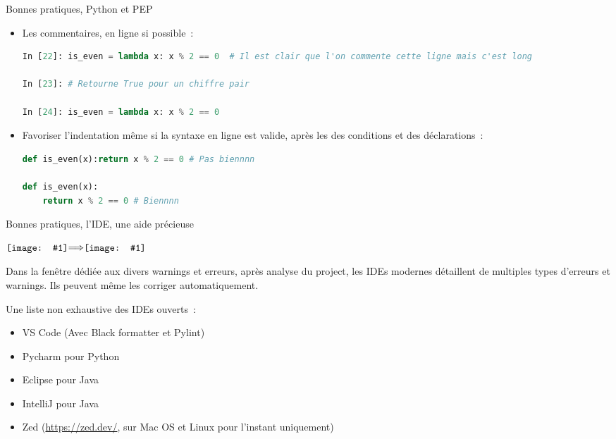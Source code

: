 \documentclass{beamer}
\newcommand*{\vcenterimage}[1]{\vcenter{\hbox{\texttt{[image: \#1]}}}}
\newcommand*{\vcenterarrow}{\vcenter{\hbox{$\Longrightarrow$}}}
\begin{document}
    \begin{frame}[fragile]{Bonnes pratiques, Python et PEP}
        \begin{itemize}
            \item Les commentaires, en ligne si possible~:
            \begin{lstlisting}[language=python]
In [22]: is_even = lambda x: x % 2 == 0  # Il est clair que l'on commente cette ligne mais c'est long

In [23]: # Retourne True pour un chiffre pair

In [24]: is_even = lambda x: x % 2 == 0
            \end{lstlisting}
            \item Favoriser l'indentation même si la syntaxe en ligne est valide, après les \textquote{:} des conditions et des déclarations~:
            \begin{lstlisting}[language=python]
def is_even(x):return x % 2 == 0 # Pas biennnn

def is_even(x):
    return x % 2 == 0 # Biennnn
            \end{lstlisting}
        \end{itemize}

    \end{frame}

    \begin{frame}{Bonnes pratiques, l'IDE, une aide précieuse}
        \centering

        $\vcenterimage{image/Pycharm-before-analysis}\vcenterarrow\vcenterimage{image/Pycharm-after-analysis}$

        \bigbreak

        \begin{flushleft}
            Dans la fenêtre dédiée aux divers warnings et erreurs, après analyse du project, les IDEs modernes détaillent de multiples types d'erreurs et warnings.
            Ils peuvent même les corriger automatiquement.

            Une liste non exhaustive des IDEs ouverts~:
            \begin{itemize}
                \item VS Code (Avec Black formatter et Pylint)
                \item Pycharm pour Python
                \item Eclipse pour Java
                \item IntelliJ pour Java
                \item Zed (\url{https://zed.dev/}, sur Mac OS et Linux pour l'instant uniquement)
            \end{itemize}
        \end{flushleft}

    \end{frame}
\end{document}
